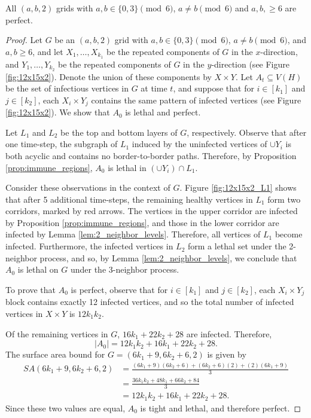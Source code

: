 \begin{con}
\label{con:2x3x0_mod6}
All $(a,b,2)$ grids with $a,b \in \{0,3\} \pmod 6$, $a \neq b \pmod 6$ and $a,b, \geq 6$ are perfect. 
\end{con}

\begin{proof}
Let $G$ be an $(a,b,2)$ grid with $a,b \in \{0,3\} \pmod 6$, $a \neq b \pmod 6$, and $a,b \geq 6$, and let $X_1, \dots, X_{k_1}$ be the repeated components of $G$ in the $x$-direction, and $Y_1, \dots, Y_{k_2}$ be the repeated components of $G$ in the $y$-direction (see Figure \ref{fig:12x15x2}). Denote the union of these components by $X \times Y$. Let $A_t \subseteq V(H)$ be the set of infectious vertices in $G$ at time $t$, and suppose that for $i \in [k_1]$ and $j \in [k_2]$, each $X_i \times Y_j$ contains the same pattern of infected vertices (see Figure \ref{fig:12x15x2}). We show that $A_0$ is lethal and perfect.

Let $L_1$ and $L_2$ be the top and bottom layers of $G$, respectively. Observe that after one time-step, the subgraph of $L_1$ induced by the uninfected vertices of $\cup Y_i$ is both acyclic and contains no border-to-border paths. Therefore, by Proposition \ref{prop:immune_regions}, $A_0$ is lethal in $(\cup Y_i) \cap L_1$. 

Consider these observations in the context of $G$. Figure \ref{fig:12x15x2_L1} shows that after 5 additional time-steps, the remaining healthy vertices in $L_1$ form two corridors, marked by red arrows. The vertices in the upper corridor are infected by Proposition \ref{prop:immune_regions}, and those in the lower corridor are infected by Lemma \ref{lem:2_neighbor_levels}. Therefore, all vertices of $L_1$ become infected. Furthermore, the infected vertices in $L_2$ form a lethal set under the 2-neighbor process, and so, by Lemma \ref{lem:2_neighbor_levels}, we conclude that $A_0$ is lethal on $G$ under the 3-neighbor process.

To prove that $A_0$ is perfect, observe that for $i \in [k_1]$ and $j \in [k_2]$, each $X_i \times Y_j$ block contains exactly 12 infected vertices, and so the total number of infected vertices in $X \times Y$ is $12k_1k_2$. 

Of the remaining vertices in $G$, $16k_1+22k_2+28$ are infected. Therefore,
$$|A_0| = 12k_1k_2 + 16k_1+22k_2+28.$$ 
The surface area bound for $G=(6k_1+9,6k_2+6,2)$ is given by
\begin{align*}
SA(6k_1+9,6k_2+6,2) &= \frac{(6k_1+9)(6k_2+6) + (6k_2+6)(2) + (2)(6k_1+9)}{3} \\
&= \frac{36k_1k_2+ 48k_1 + 66k_2 + 84}{3} \\
&= 12k_1k_2+16k_1+22k_2+28.
\end{align*}
Since these two values are equal, $A_0$ is tight and lethal, and therefore perfect.
\end{proof}

